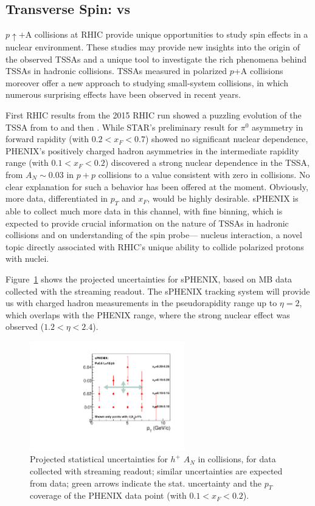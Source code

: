 \subsection {Transverse Spin: \pp vs \pA}

$p\uparrow$$+$A collisions at RHIC provide unique opportunities to
study spin effects in a nuclear environment. These studies may provide
new insights into the origin of the observed TSSAs and a unique tool
to investigate the rich phenomena behind TSSAs in hadronic
collisions. TSSAs measured in polarized $p$+A collisions moreover
offer a new approach to studying small-system collisions, in which
numerous surprising effects have been observed in recent years. 

First RHIC results from the 2015 RHIC run showed a puzzling evolution
of the TSSA from \pp to \pAl and then \pAu. While STAR's
preliminary result for $\pi^{0}$ asymmetry in forward rapidity (with
$0.2<x_F<0.7$) showed no significant nuclear dependence, PHENIX's
positively charged hadron asymmetries in the intermediate rapidity
range (with $0.1<x_F<0.2$) discovered a strong nuclear dependence in
the TSSA, from $A_N \sim 0.03$ in $p+p$ collisions to a value
consistent with zero in \pAu collisions. No clear explanation for
such a behavior has been offered at the moment. Obviously, more data,
differentiated in $p_T$ and $x_F$, would be highly desirable. sPHENIX
is able to collect much more data in this channel, with fine binning,
which is expected to provide crucial information on the nature of
TSSAs in hadronic collisions and on understanding of the spin probe---
nucleus interaction, a novel topic directly associated with RHIC's
unique ability to collide polarized protons with nuclei. 

Figure~\ref{fig:AN_h} shows the projected uncertainties for sPHENIX,
based on MB data collected with the streaming readout. The sPHENIX
tracking system will provide us with charged hadron measurements in
the pseudorapidity range up to $\eta=2$, which overlaps with the
PHENIX range, where the strong nuclear effect was observed
($1.2<\eta<2.4$). 

\begin{figure}[htbp]
\centering
\includegraphics[width=0.60\textwidth]{figs/sphenix_han.pdf}
\caption{Projected statistical uncertainties for $h^{+}$ $A_N$ in
  \pp collisions, for data collected with streaming readout; similar
  uncertainties are expected from \pAu data; green arrows indicate
  the stat. uncertainty and the $p_T$ coverage of the PHENIX data
  point (with $0.1<x_F<0.2$).} 
\label{fig:AN_h}
\end{figure}

